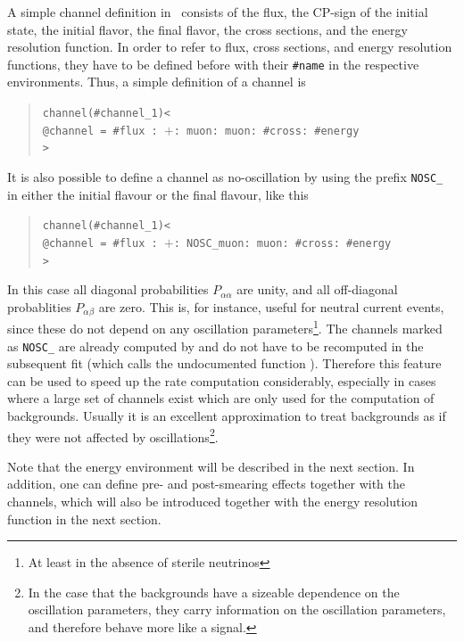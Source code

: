 A simple channel definition in \GLOBES\ consists of the flux,
the CP-sign of the initial state, the initial flavor, the final flavor,
the cross sections, and the energy resolution function. In order to refer to
flux, cross sections, and energy resolution functions, they have to be 
defined before with their {\tt \#name} in the respective environments. 
Thus, a simple definition of a channel is
\begin{quote}
{\tt channel(\#channel\_1)<\\
\tb @channel = \#flux : $+$: muon: muon: \#cross: \#energy\\
>}
\end{quote}
%
It is also possible to define a channel as no-oscillation by using the
prefix {\tt NOSC\_} 
in either the initial  flavour or 
the final flavour, like this
\begin{quote}
{\tt channel(\#channel\_1)<\\
\tb @channel = \#flux : $+$: NOSC\_muon: muon: \#cross: \#energy\\
>}
\end{quote}
%
In this case all diagonal probabilities $P_{\alpha\alpha}$ are unity, and all off-diagonal probablities  $P_{\alpha\beta}$ are zero. This is,
for instance, useful for
neutral current events, since these do not depend on any oscillation 
parameters\footnote{At least in the absence of sterile neutrinos}. The channels
marked as {\tt NOSC\_} are already computed by 
and do not have to be recomputed in the subsequent fit (which calls the undocumented function ).
Therefore this feature can be used to speed up the rate 
computation considerably, especially in cases where a large set
of channels exist which are only used for the computation of backgrounds.
Usually it is an excellent approximation to treat backgrounds as if they
were not affected by oscillations\footnote{In the case that the backgrounds have
a sizeable dependence on the oscillation parameters, they carry information
on the oscillation parameters, and therefore behave more like a signal.}.

Note that the energy environment will be described in the next section. 
In addition, one can define pre- and post-smearing effects together
with the channels, which will also be introduced together with the
energy resolution function in the next section.

